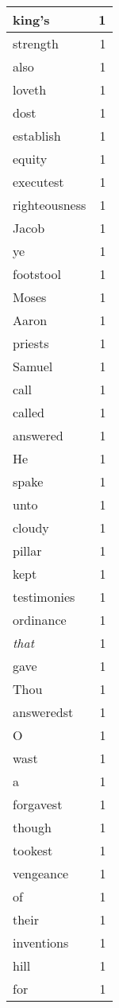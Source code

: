 \begin{center}
\begin{longtable}{l|r}
king's & 1 \\ \hline
strength & 1 \\ \hline
also & 1 \\ \hline
loveth & 1 \\ \hline
dost & 1 \\ \hline
establish & 1 \\ \hline
equity & 1 \\ \hline
executest & 1 \\ \hline
righteousness & 1 \\ \hline
Jacob & 1 \\ \hline
ye & 1 \\ \hline
footstool & 1 \\ \hline
Moses & 1 \\ \hline
Aaron & 1 \\ \hline
priests & 1 \\ \hline
Samuel & 1 \\ \hline
call & 1 \\ \hline
called & 1 \\ \hline
answered & 1 \\ \hline
He & 1 \\ \hline
spake & 1 \\ \hline
unto & 1 \\ \hline
cloudy & 1 \\ \hline
pillar & 1 \\ \hline
kept & 1 \\ \hline
testimonies & 1 \\ \hline
ordinance & 1 \\ \hline
\emph{that} & 1 \\ \hline
gave & 1 \\ \hline
Thou & 1 \\ \hline
answeredst & 1 \\ \hline
O & 1 \\ \hline
wast & 1 \\ \hline
a & 1 \\ \hline
forgavest & 1 \\ \hline
though & 1 \\ \hline
tookest & 1 \\ \hline
vengeance & 1 \\ \hline
of & 1 \\ \hline
their & 1 \\ \hline
inventions & 1 \\ \hline
hill & 1 \\ \hline
for & 1 \\ \hline
\end{longtable}
\end{center}



